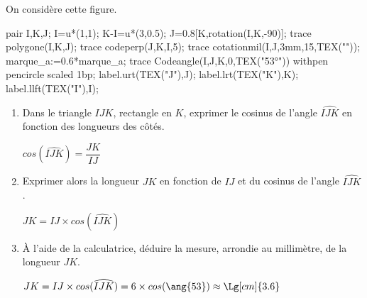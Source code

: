 \begin{corrige}
    On considère cette figure.

    \begin{Geometrie}
        pair I,K,J;
        I=u*(1,1);
        K-I=u*(3,0.5);
        J=0.8[K,rotation(I,K,-90)];
        trace polygone(I,K,J);
        trace codeperp(J,K,I,5);
        trace cotationmil(I,J,3mm,15,TEX(""));
        marque_a:=0.6*marque_a;                
        trace Codeangle(I,J,K,0,TEX("\ang{53}")) withpen pencircle scaled 1bp;
        label.urt(TEX("J"),J);
        label.lrt(TEX("K"),K);
        label.llft(TEX("I"),I);
    \end{Geometrie}

    \begin{enumerate}
        \item Dans le triangle $IJK$, rectangle en $K$, exprimer le cosinus de l'angle $\widehat{IJK}$ en fonction des longueurs des côtés.
        
        {\color{red} $cos(\widehat{IJK})=\dfrac{JK}{IJ}$}
        \item Exprimer alors la longueur $JK$ en fonction de $IJ$ et du cosinus de l'angle $\widehat{IJK}$.
        
        {\color{red} $JK=IJ\times cos(\widehat{IJK})$}
        \item À l'aide de la calculatrice, déduire la mesure, arrondie au millimètre, de la longueur $JK$.
        
        {\color{red} $JK=IJ\times cos(\widehat{IJK})=6\times cos(\ang{53})\approx\Lg[cm]{3.6}$}
    \end{enumerate}
\end{corrige}

